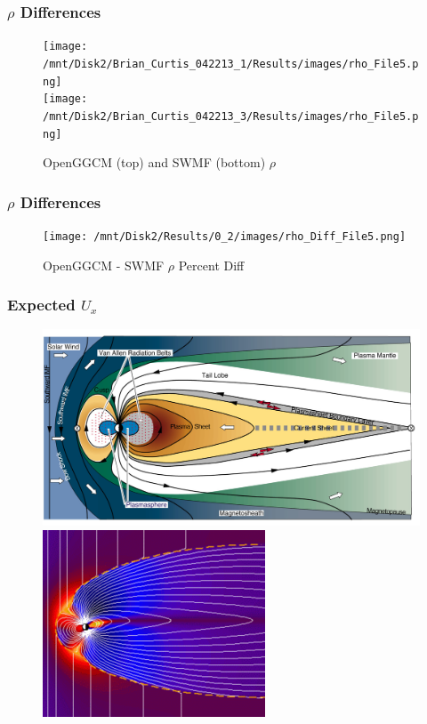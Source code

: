 \begin{frame}
\frametitle{$\rho$ Differences}
\begin{center}
\begin{figure}
\texttt{[image: /mnt/Disk2/Brian\_Curtis\_042213\_1/Results/images/rho\_File5.png]}\\
\texttt{[image: /mnt/Disk2/Brian\_Curtis\_042213\_3/Results/images/rho\_File5.png]}\\
\caption{OpenGGCM (top) and SWMF (bottom) $\rho$}
\end{figure}
\end{center}
\end{frame}


\begin{frame}
\frametitle{$\rho$ Differences}
\begin{center}
\begin{figure}
\texttt{[image: /mnt/Disk2/Results/0\_2/images/rho\_Diff\_File5.png]}\\
\caption{OpenGGCM - SWMF $\rho$ Percent Diff}
\end{figure}
\end{center}
\end{frame}

\begin{frame}
\frametitle{Expected $U_x$}
\begin{figure}
\includegraphics[scale=0.21]{images/Rice_Magnetosphere.jpg}\\
\includegraphics[scale=0.4]{images/tsyganenko.png}
\end{figure}
\end{frame}

